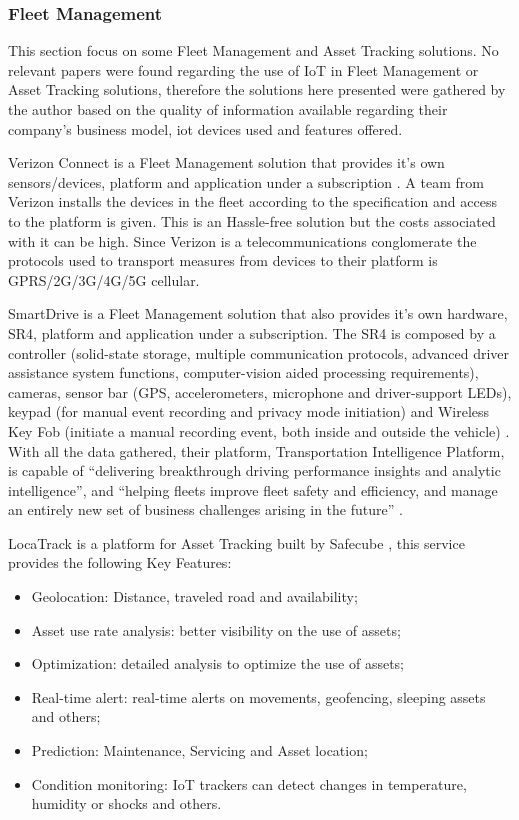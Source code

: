\subsubsection{Fleet Management}
\label{subsubsec:stateofart:arch:solutions:fleet}

This section focus on some Fleet Management and Asset Tracking solutions. No relevant papers were found regarding the use of \gls{IoT} in Fleet Management or Asset Tracking solutions, therefore the solutions here presented were gathered by the author based on the quality of information available regarding their company's business model, iot devices used and features offered.

Verizon Connect is a Fleet Management solution that provides it's own sensors/devices, platform and application under a subscription \parencite{verizon-iot}.
A team from Verizon installs the devices in the fleet according to the specification and access to the platform is given. This is an Hassle-free solution but the costs associated with it can be high. Since Verizon is a telecommunications conglomerate the protocols used to transport measures from devices to their platform is GPRS/2G/3G/4G/5G cellular.

SmartDrive is a Fleet Management solution that also provides it's own hardware, SR4, platform and application under a subscription. The SR4 is composed by a controller (solid-state storage, multiple communication protocols, advanced driver assistance system functions, computer-vision aided processing requirements), cameras, sensor bar (GPS, accelerometers, microphone and driver-support LEDs), keypad (for manual event recording and privacy mode initiation) and Wireless Key Fob (initiate a manual recording event, both inside and outside the vehicle) \parencite{smartdrive-iot}. With all the data gathered, their platform, Transportation Intelligence Platform, is capable of ``delivering breakthrough driving performance insights and analytic intelligence'', and ``helping fleets improve fleet safety and efficiency, and manage an entirely new set of business challenges arising in the future'' \parencite{smartdrive-iot2}.

LocaTrack is a platform for Asset Tracking built by Safecube \parencite{safecube}, this service provides the following Key Features: 

\begin{itemize}
    \item Geolocation: Distance, traveled road and availability;
    \item Asset use rate analysis: better visibility on the use of assets;
    \item Optimization: detailed analysis to optimize the use of assets;
    \item Real-time alert: real-time alerts on movements, geofencing, sleeping assets and others;
    \item Prediction: Maintenance, Servicing and Asset location;
    \item Condition monitoring: IoT trackers can detect changes in temperature, humidity or shocks and others.
\end{itemize}

